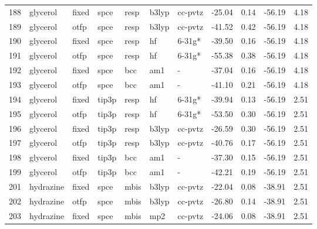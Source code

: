 \begin{tabular}{lllllllrrrr}
188 &                      glycerol &  fixed &   spce &   resp &   b3lyp &      cc-pvtz &      -25.04 &     0.14 &      -56.19 &      4.18 \\
189 &                      glycerol &   otfp &   spce &   resp &   b3lyp &      cc-pvtz &      -41.52 &     0.42 &      -56.19 &      4.18 \\
190 &                      glycerol &  fixed &   spce &   resp &      hf &       6-31g* &      -39.50 &     0.16 &      -56.19 &      4.18 \\
191 &                      glycerol &   otfp &   spce &   resp &      hf &       6-31g* &      -55.38 &     0.38 &      -56.19 &      4.18 \\
192 &                      glycerol &  fixed &   spce &    bcc &     am1 &            - &      -37.04 &     0.16 &      -56.19 &      4.18 \\
193 &                      glycerol &   otfp &   spce &    bcc &     am1 &            - &      -41.10 &     0.21 &      -56.19 &      4.18 \\
194 &                      glycerol &  fixed &  tip3p &   resp &      hf &       6-31g* &      -39.94 &     0.13 &      -56.19 &      2.51 \\
195 &                      glycerol &   otfp &  tip3p &   resp &      hf &       6-31g* &      -53.50 &     0.30 &      -56.19 &      2.51 \\
196 &                      glycerol &  fixed &  tip3p &   resp &   b3lyp &      cc-pvtz &      -26.59 &     0.30 &      -56.19 &      2.51 \\
197 &                      glycerol &   otfp &  tip3p &   resp &   b3lyp &      cc-pvtz &      -40.76 &     0.17 &      -56.19 &      2.51 \\
198 &                      glycerol &  fixed &  tip3p &    bcc &     am1 &            - &      -37.30 &     0.15 &      -56.19 &      2.51 \\
199 &                      glycerol &   otfp &  tip3p &    bcc &     am1 &            - &      -42.21 &     0.19 &      -56.19 &      2.51 \\
201 &                     hydrazine &  fixed &   spce &   mbis &   b3lyp &      cc-pvtz &      -22.04 &     0.08 &      -38.91 &      2.51 \\
202 &                     hydrazine &   otfp &   spce &   mbis &   b3lyp &      cc-pvtz &      -26.80 &     0.14 &      -38.91 &      2.51 \\
203 &                     hydrazine &  fixed &   spce &   mbis &     mp2 &      cc-pvtz &      -24.06 &     0.08 &      -38.91 &      2.51 \\

\end{tabular}
